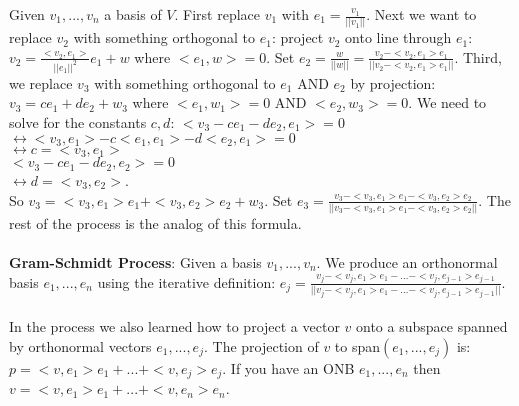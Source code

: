 \documentclass{article}
\begin{document}
Given $v_1,...,v_n$ a basis of $V$. First replace $v_1$ with $ e_1 = \frac{v_1}{||v_1||}$. Next we want to replace $v_2$ with something orthogonal to $e_1$: project $v_2$ onto line through $e_1$: $v_2 = \frac{<v_2, e_1>}{||e_1||^2} e_1 + w$ where $<e_1, w> = 0$. Set $e_2 = \frac{w}{||w||} = \frac{v_2 - <v_2, e_1> e_1}{||v_2 - <v_2, e_1>e_1||} $. Third, we replace $v_3$ with something orthogonal to $e_1$ AND $e_2$ by projection: $v_3 = ce_1 + de_2 + w_3$ where $<e_1, w_1> = 0$ AND $<e_2, w_3> = 0$. We need to solve for the constants $c, d$: $<v_3 - ce_1 - de_2, e_1> = 0$\\
$\leftrightarrow <v_3, e_1> - c<e_1,e_1> - d<e_2, e_1> = 0$\\
$\leftrightarrow c = <v_3, e_1>$\\
$<v_3 - ce_1 -de_2, e_2> = 0$\\
$\leftrightarrow d = <v_3, e_2>$. \\
So $v_3 = <v_3, e_1>e_1 + <v_3, e_2>e_2 + w_3$. Set $e_3 = \frac{v_3 - <v_3, e_1>e_1 - <v_3, e_2>e_2}{||v_3 - <v_3, e_1>e_1 - <v_3, e_2>e_2||}$. The rest of the process is the analog of this formula. \\\\
\textbf{Gram-Schmidt Process}: Given a basis $v_1, ..., v_n$. We produce an orthonormal basis $e_1, ..., e_n$ using the iterative definition: $e_j = \frac{v_j - <v_j, e_1>e_1 - ... - <v_j, e_{j-1}>e_{j-1}}{||v_j - <v_j, e_1>e_1 - ... - <v_j, e_{j-1}>e_{j-1}||}$. \\\\
In the process we also learned how to project a vector $v$ onto a subspace spanned by orthonormal vectors $e_1, ..., e_j$. The projection of $v$ to span$(e_1, ..., e_j)$ is: $p = <v, e_1>e_1 + ... + <v, e_j>e_j$. If you have an ONB $e_1, ..., e_n$ then $v=<v, e_1>e_1 + ... + <v, e_n>e_n$. 
\end{document}
